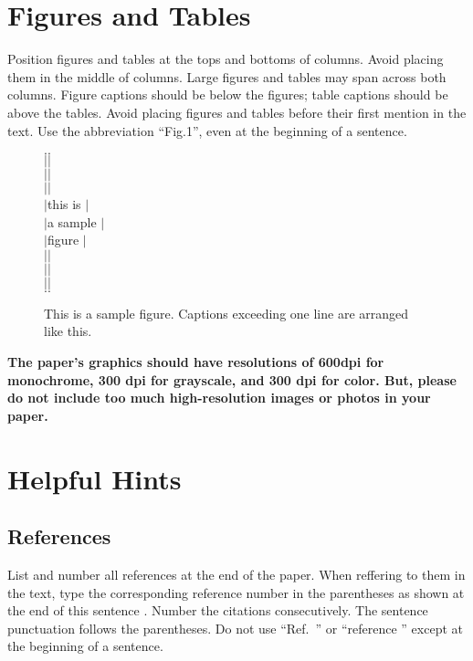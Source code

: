 

\section{Figures and Tables}
Position figures and tables at the tops and bottoms of columns. Avoid
placing them in the middle of columns. Large figures and tables may
span across both columns. Figure captions should be below the figures;
table captions should be above the tables. Avoid placing figures and
tables before their first mention in the text. Use the abbreviation
``Fig.1'', even at the beginning of a sentence.

\begin{figure}[tb]
\begin{center}
\begin{minipage}{5cm}
$.$\hrulefill $.$\\$|$\hfill $|$\\$|$\hfill $|$\\$|$\hfill $|$\\
$|$\hfill this is \hfill $|$\\
$|$\hfill a sample \hfill $|$\\
$|$\hfill  figure  \hfill $|$\\
$|$\hfill $|$\\$|$\hfill $|$\\$|$\hfill $|$\\$.$\hrulefill $.$\\
\end{minipage}
\caption{This is a sample figure. Captions exceeding
one line are arranged like this.}
\end{center}
\end{figure}

{\bf
The paper's graphics should have resolutions of 600dpi for monochrome,
300 dpi for grayscale, and 300 dpi for color. But, please do not include
too much high-resolution images or photos in your paper.
} %

\section{Helpful Hints}

\subsection{References}
List and number all references at the end of the paper. When reffering
to them in the text, type the corresponding reference number in the
parentheses as shown at the end of this sentence \cite{key}. Number
the citations consecutively. The sentence punctuation follows the
parentheses. Do not use ``Ref.\ \cite{baz}'' or
``reference \cite{baz}'' except at the beginning of a sentence.

